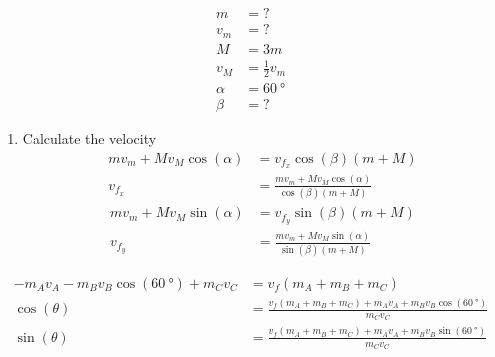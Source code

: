 \documentclass{article}
\begin{document}
\begin{align*}
	m & = ? \\
	v_m & = ? \\
	M & = 3m \\
	v_M & = \frac{1}{2}v_m \\
	\alpha & = \SI{60}{\degree} \\
	\beta & = ?
\end{align*}
\begin{enumerate}[label = \textbf{(\alph*)}]
	\item Calculate the velocity
		\begin{align*}
			mv_m + Mv_M\cos(\alpha) & = v_{f_x}\cos(\beta)(m + M) \\
			v_{f_x} & = \frac{ mv_m + Mv_M\cos(\alpha) }{ \cos(\beta)(m + M) }
		\end{align*}
		\begin{align*}
			mv_m + Mv_M\sin(\alpha) & = v_{f_y}\sin(\beta)(m + M) \\
			v_{f_y} & = \frac{ mv_m + Mv_M\sin(\alpha) }{ \sin(\beta)(m + M) }
		\end{align*}
\end{enumerate}

\begin{align*}
	-m_Av_A - m_Bv_B\cos(\SI{60}{\degree}) + m_Cv_C & = v_f(m_A + m_B + m_C) \\
	\cos(\theta) & = \frac{ v_f(m_A + m_B + m_C) + m_Av_A + m_Bv_B\cos(\SI{60}{\degree}) }{ m_Cv_C } \\
	\sin(\theta) & = \frac{ v_f(m_A + m_B + m_C) + m_Av_A + m_Bv_B\sin(\SI{60}{\degree}) }{ m_Cv_C }
\end{align*}
\end{document}

